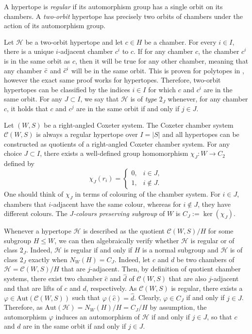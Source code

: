 \documentclass[10pt,a4paper]{amsart}
\newcommand{\Aut}{\mathrm{Aut}}
\newcommand{\C}{\mathcal{C}}
\begin{document}
A hypertope is \emph{regular} if its automorphism group has a single orbit on its chambers. A \emph{two-orbit} hypertope has precisely two orbits of chambers under the action of its automorphism group. 

Let $\mathcal{H}$ be a two-orbit hypertope and let $c \in H$  be a chamber. For every $i \in I$, there is a unique $i$-adjacent chamber $c^i$ to $c$. If for any chamber $c$, the chamber $c^i$ is in the same orbit as $c$, then it will be true for any other chamber, meaning that any chamber $\Bar{c}$ and $\Bar{c}^i$ will be in the same orbit. This is proven for polytopes in \cite[Proposition 2.219]{Pellicer_2025}, however the exact same proof works for hypertopes. Therefore, two-orbit hypertopes can be classified by the indices $i \in I$ for which $c$ and $c^i$ are in the same orbit. For any $J \subset I$, we say that $\mathcal{H}$ is of \emph{type} $2_J$ whenever, for any chamber $c$, it holds that $c$ and $c^j$ are in the same orbit if and only if $j \in J$.

Let $(W,S)$ be a right-angled Coxeter system. The Coxeter chamber system $\C(W,S)$ is always a regular hypertope over $I = |S|$ and all hypertopes can be constructed as quotients of a right-angled Coxeter chamber system. For any choice $J \subset I$, there exists a well-defined group homomorphism $\chi_J \colon W \to C_2$ defined by
$$
\chi_J(r_i) = \begin{cases}0,&i\in J,\\1,&i\notin J.\end{cases}
$$
One should think of $\chi_J$ in terms of colouring of the chamber system. For $i \in J$, chambers that $i$-adjacent have the same colour, whereas for $i \notin J$, they have different colours. The \emph{$J$-colours preserving subgroup} of $W$ is $C_J := \ker(\chi_J)$. 


 Whenever a hypertope $\mathcal{H}$ is described as the quotient $\C(W,S)/H$ for some subgroup $H \leq W$, we can then algebraically verify whether $\mathcal{H}$ is regular or of class $2_J$. Indeed, $\mathcal{H}$ is regular if and only if $H$ is a normal subgroup and $\mathcal{H}$ is of class $2_J$ exactly when $N_W(H) = C_J$. Indeed, let $c$ and $d$ be two chambers of $\mathcal{H}=\C(W,S)/H$ that are $j$-adjacent. Then, by definition of quotient chamber systems, there exist two chamber $\hat{c}$ and $\hat{d}$ of $\C(W,S)$ that are also $j$-adjacent and that are lifts of $c$ and $d$, respectively. As $\C(W,S)$ is regular, there exists a $\varphi \in \Aut(\C(W,S))$ such that $\varphi(\hat{c}) = \hat{d}$. Clearly, $\varphi \in C_J$ if and only if $j \in J$. Therefore, as $\Aut(\mathcal{H}) = N_W(H)/H = C_J/H$ by assumption, the automorphism $\varphi$ induces an automorphism of $\mathcal{H}$ if and only if $j \in J$, so that $c$ and $d$ are in the same orbit if and only if $j \in J$.
\end{document}
